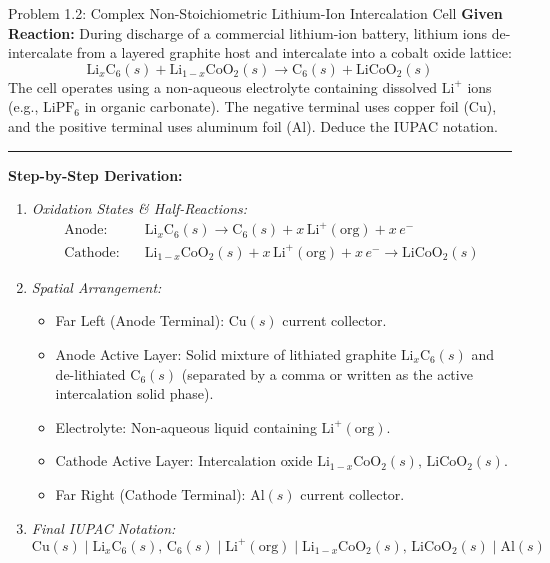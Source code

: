 \documentclass[10pt,a4paper]{article}
\begin{document}
\begin{examplebox}{Problem 1.2: Complex Non-Stoichiometric Lithium-Ion Intercalation Cell}
\textbf{Given Reaction:}
During discharge of a commercial lithium-ion battery, lithium ions de-intercalate from a layered graphite host and intercalate into a cobalt oxide lattice:
\begin{equation*}
    \text{Li}_x\text{C}_6(s) + \text{Li}_{1-x}\text{CoO}_2(s) \longrightarrow \text{C}_6(s) + \text{LiCoO}_2(s)
\end{equation*}
The cell operates using a non-aqueous electrolyte containing dissolved $\text{Li}^+$ ions (e.g., $\text{LiPF}_6$ in organic carbonate). The negative terminal uses copper foil ($\text{Cu}$), and the positive terminal uses aluminum foil ($\text{Al}$). Deduce the IUPAC notation.

\vspace{0.3cm}\hrule\vspace{0.3cm}
\textbf{Step-by-Step Derivation:}
\begin{enumerate}
    \item \textit{Oxidation States \& Half-Reactions:}
    \begin{align*}
        \text{Anode:} \quad & \text{Li}_x\text{C}_6(s) \longrightarrow \text{C}_6(s) + x\,\text{Li}^+(\text{org}) + x\,e^- \\
        \text{Cathode:} \quad & \text{Li}_{1-x}\text{CoO}_2(s) + x\,\text{Li}^+(\text{org}) + x\,e^- \longrightarrow \text{LiCoO}_2(s)
    \end{align*}
    \item \textit{Spatial Arrangement:}
    \begin{itemize}
        \item Far Left (Anode Terminal): $\text{Cu}(s)$ current collector.
        \item Anode Active Layer: Solid mixture of lithiated graphite $\text{Li}_x\text{C}_6(s)$ and de-lithiated $\text{C}_6(s)$ (separated by a comma or written as the active intercalation solid phase).
        \item Electrolyte: Non-aqueous liquid containing $\text{Li}^+(\text{org})$.
        \item Cathode Active Layer: Intercalation oxide $\text{Li}_{1-x}\text{CoO}_2(s),\, \text{LiCoO}_2(s)$.
        \item Far Right (Cathode Terminal): $\text{Al}(s)$ current collector.
    \end{itemize}
    \item \textit{Final IUPAC Notation:}
    $$\text{Cu}(s) \mid \text{Li}_x\text{C}_6(s),\, \text{C}_6(s) \mid \text{Li}^+(\text{org}) \mid \text{Li}_{1-x}\text{CoO}_2(s),\, \text{LiCoO}_2(s) \mid \text{Al}(s)$$
\end{enumerate}
\end{examplebox}
\end{document}
